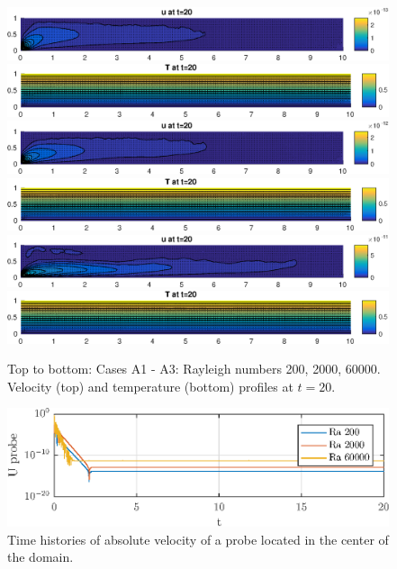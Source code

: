 \documentclass[10pt,a4paper]{article}
\begin{document}
\begin{figure}[H]
  \centering
  \includegraphics[width=\linewidth]{Part2_Case_A1_Velocity.eps}
  \includegraphics[width=\linewidth]{Part2_Case_A1_Temp.eps}
    \includegraphics[width=\linewidth]{Part2_Case_A2_Velocity.eps}
  \includegraphics[width=\linewidth]{Part2_Case_A2_Temp.eps}
   \includegraphics[width=\linewidth]{Part2_Case_A3_Velocity.eps}
  \includegraphics[width=\linewidth]{Part2_Case_A3_Temp.eps}
\caption{Top to bottom: Cases A1 - A3: Rayleigh numbers 200, 2000, 60000. Velocity (top) and temperature (bottom) profiles at $t = 20$.}
\label{fig:2A1}
\end{figure}



\begin{figure}[H]
\centering
\includegraphics[]{Probe_history2A.eps}
\caption{Time histories of absolute velocity of a probe located in the center of the domain.}
\label{fig:timeseries_1A}
\end{figure}
\end{document}
